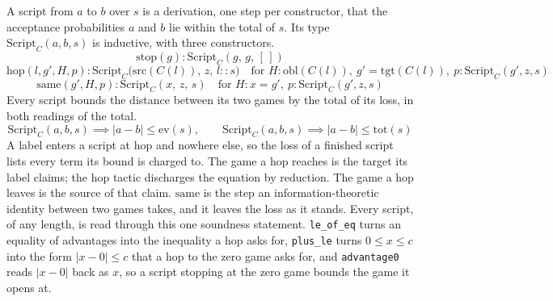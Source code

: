 \begin{definition}
  \label{def:hop_script}
  \rocqok
  A script from $a$ to $b$ over $s$ is a derivation, one step per constructor,
  that the acceptance probabilities $a$ and $b$ lie within the total of $s$.
  Its type $\mathrm{Script}_C(a, b, s)$ is inductive, with three constructors.
  \[ \mathrm{stop}(g) : \mathrm{Script}_C(g,\, g,\, [\,]) \]
  \[ \mathrm{hop}(l, g', H, p) :
       \mathrm{Script}_C\big(\mathrm{src}(C(l)),\, z,\, l :: s\big)
     \quad\text{for } H : \mathrm{obl}(C(l)),\
       g' = \mathrm{tgt}(C(l)),\ p : \mathrm{Script}_C(g', z, s) \]
  \[ \mathrm{same}(g', H, p) : \mathrm{Script}_C(x,\, z,\, s)
     \quad\text{for } H : x = g',\ p : \mathrm{Script}_C(g', z, s) \]
  Every script bounds the distance between its two games by the total of its
  loss, in both readings of the total.
  \[ \mathrm{Script}_C(a, b, s) \implies
       \lvert a - b \rvert \le \mathrm{ev}(s), \qquad
     \mathrm{Script}_C(a, b, s) \implies
       \lvert a - b \rvert \le \mathrm{tot}(s) \]
  A label enters a script at $\mathrm{hop}$ and nowhere else, so the loss of a
  finished script lists every term its bound is charged to. The game a hop
  reaches is the target its label claims; the hop tactic discharges the
  equation by reduction. The game a hop leaves is the source of that claim.
  $\mathrm{same}$ is the step an information-theoretic identity between two
  games takes, and it leaves the loss as it stands. Every script, of any
  length, is read through this one soundness statement. \texttt{le\_of\_eq} turns an equality of advantages into the
  inequality a hop asks for, \texttt{plus\_le} turns $0 \le x \le c$ into the
  form $\lvert x - 0 \rvert \le c$ that a hop to the zero game asks for, and
  \texttt{advantage0} reads $\lvert x - 0 \rvert$ back as $x$, so a script
  stopping at the zero game bounds the game it opens at.
\end{definition}

